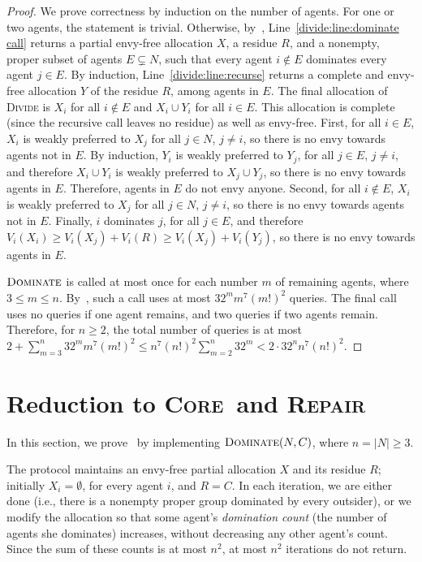 \documentclass[11pt]{article}
\newcommand{\Core}{\textsc{Core}}
\newcommand{\Repair}{\textsc{Repair}}
\newcommand{\Dominate}{\textsc{Dominate}}
\theoremstyle{plain}
\theoremstyle{definition}
\theoremstyle{plain}
\begin{document}
\begin{proof}
We prove correctness by induction on the number of agents.
For one or two agents, the statement is trivial. Otherwise, by~, Line~\ref{divide:line:dominate call} returns a partial envy-free allocation $X$, a residue $R$, and a nonempty, proper subset of agents $E \subsetneq N$, such that every agent $i \notin E$ dominates every agent $j \in E$. By induction, Line~\ref{divide:line:recurse} returns a complete and envy-free allocation $Y$ of the residue $R$, among agents in $E$.  The final allocation of \textsc{Divide} is $X_i$ for all $i \notin E$ and $X_i \cup Y_i$ for all $i \in E$. This allocation is complete (since the recursive call leaves no residue) as well as envy-free. First, for all $i \in E$, $X_i$ is weakly preferred to $X_j$ for all $j \in N$, $j \neq i$, so there is no envy towards agents not in $E$. By induction, $Y_i$ is weakly preferred to $Y_j$, for all $j \in E$, $j \neq i$, and therefore $X_i \cup Y_i$ is weakly preferred to $X_j \cup Y_j$, so there is no envy towards agents in $E$. Therefore, agents in $E$ do not envy anyone. Second, for all $i \notin E$, $X_i$ is weakly preferred to $X_j$ for all $j \in N$, $j \neq i$, so there is no envy towards agents not in $E$. Finally, $i$ dominates $j$, for all $j \in E$, and therefore $V_i(X_i) \geq V_i(X_j) + V_i(R) \geq V_i(X_j) + V_i(Y_j)$, so there is no envy towards agents in $E$.

$\Dominate$ is called at most once for each number $m$ of remaining agents, where $3 \leq m \leq n$. By~, such a call uses at most $32^m m^7(m!)^2$ queries. The final call uses no queries if one agent remains, and two queries if two agents remain. Therefore, for $n\ge2$, the total number of queries is at most
$2+\sum_{m=3}^n 32^m m^7(m!)^2
\le n^7(n!)^2\sum_{m=2}^n32^m
<2\cdot32^n n^7(n!)^2$.
\end{proof}



\section{Reduction to \Core~and \Repair}\label{sec: reduce to core and repair}

In this section, we prove~ by implementing $\Dominate(N,C)$, where $n=|N|\geq 3$. 

The protocol maintains an envy-free partial allocation $X$ and its residue $R$; initially $X_i=\emptyset$, for every agent $i$, and $R=C$. In each iteration, we are either done (i.e., there is a nonempty proper group dominated by every outsider), or we modify the allocation so that some agent's \emph{domination count} (the number of agents she dominates) increases, without decreasing any other agent's count. Since the sum of these counts is at most $n^2$, at most $n^2$ iterations do not return.
\end{document}

